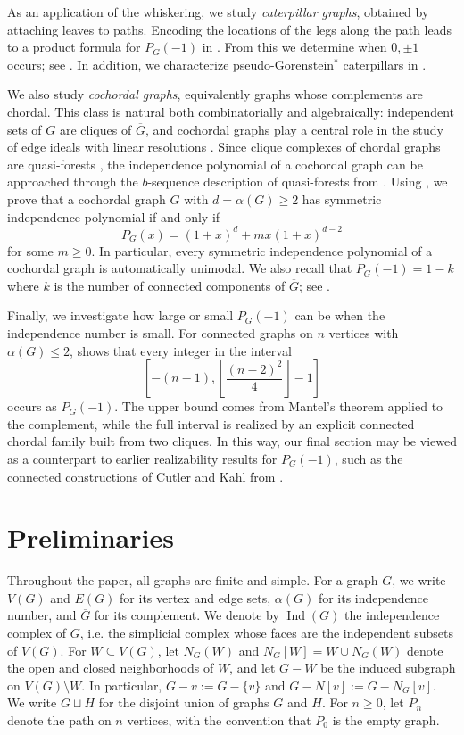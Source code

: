 \documentclass[12pt]{amsart}
\theoremstyle{plain}
\theoremstyle{definition}
\DeclareMathOperator{\Ind}{Ind}
\begin{document}
As an application of the whiskering, we study \emph{caterpillar
graphs}, obtained by attaching leaves to paths. Encoding the locations of the legs along the path leads to a
product formula for \(P_G(-1)\) in . From this we
determine when  \(0,\pm1\) occurs; see
. In addition, we 
characterize pseudo-Gorenstein\(^*\) caterpillars in
.


We also study \emph{cochordal graphs}, equivalently graphs whose complements are
chordal. This class is natural both combinatorially and algebraically: independent
sets of \(G\) are cliques of \(\overline{G}\), and cochordal graphs play a central
role in the study of edge ideals with linear resolutions \cite{Froberg,HHZ_linear_res}. Since clique complexes of
chordal graphs are quasi-forests \cite{HHZ-CM-chordal}, the independence polynomial
of a cochordal graph can be approached through the \(b\)-sequence description of
quasi-forests from \cite{Combinatorica_cochordal}.  Using \cite{Combinatorica_cochordal}, we prove that a cochordal graph
\(G\) with \(d=\alpha(G)\geq 2\) has symmetric independence polynomial if and only
if
\[
P_G(x)=(1+x)^d+mx(1+x)^{d-2}
\]
for some \(m\geq 0\). In particular, every symmetric independence polynomial of a
cochordal graph is automatically unimodal. We also recall that $P_G(-1)=1-k$
where $k$ is the number of connected components of \(\overline{G}\); see
. 


Finally, we investigate how large or small \(P_G(-1)\) can be when the
independence number is small. For connected graphs on \(n\) vertices with
\(\alpha(G)\le 2\),  shows that every integer in the
interval
\[
\left[-(n-1),  \left\lfloor \frac{(n-2)^2}{4}\right\rfloor-1\right]
\]
occurs as \(P_G(-1)\). The upper bound comes from Mantel's theorem applied to the
complement, while the full interval is realized by an explicit connected chordal
family built from two cliques. In this way, our final section may be viewed as a counterpart to earlier realizability results for
\(P_G(-1)\), such as the connected constructions of Cutler and Kahl from \cite{Bound_indp_poly_neg_1}.


\section{Preliminaries}

Throughout the paper, all graphs are finite and simple. For a graph \(G\), we write
\(V(G)\) and \(E(G)\) for its vertex and edge sets, \(\alpha(G)\) for its
independence number, and \(\overline{G}\) for its complement. We denote by
\(\Ind(G)\) the independence complex of \(G\), i.e. the simplicial complex whose
faces are the independent subsets of \(V(G)\). For \(W\subseteq V(G)\), let
\(N_G(W)\) and \(N_G[W]=W\cup N_G(W)\) denote the open and closed neighborhoods of
\(W\), and let \(G-W\) be the induced subgraph on \(V(G)\setminus W\). In
particular, \(G-v:=G-\{v\}\) and \(G-N[v]:=G-N_G[v]\). We write \(G\sqcup H\) for
the disjoint union of graphs \(G\) and \(H\). For \(n\ge 0\), let \(P_n\) denote
the path on \(n\) vertices, with the convention that \(P_0\) is the empty graph.
\end{document}
